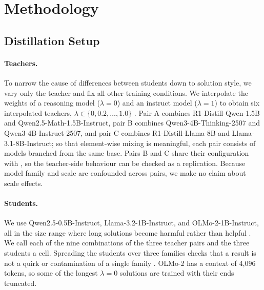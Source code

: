 \section{Methodology}
\label{sec:method}

\subsection{Distillation Setup}
\label{sec:setup}

\paragraph{Teachers.}
To narrow the cause of differences between students down to solution style, we vary only the teacher and fix all other training conditions.
We interpolate the weights of a reasoning model ($\lambda=0$) and an instruct model ($\lambda=1$) to obtain six interpolated teachers, $\lambda \in \{0, 0.2, \dots, 1.0\}$ \citep{wortsman2022soups,ilharco2023task}.
Pair A combines R1-Distill-Qwen-1.5B and Qwen2.5-Math-1.5B-Instruct, pair B combines Qwen3-4B-Thinking-2507 and Qwen3-4B-Instruct-2507, and pair C combines R1-Distill-Llama-8B and Llama-3.1-8B-Instruct; so that element-wise mixing is meaningful, each pair consists of models branched from the same base.
Pairs B and C share their configuration with \citet{wu2026interpolation}, so the teacher-side behaviour can be checked as a replication.
Because model family and scale are confounded across pairs, we make no claim about scale effects.

\paragraph{Students.}
We use Qwen2.5-0.5B-Instruct, Llama-3.2-1B-Instruct, and OLMo-2-1B-Instruct, all in the size range where long solutions become harmful rather than helpful \citep{li2025small}.
We call each of the nine combinations of the three teacher pairs and the three students a cell.
Spreading the students over three families checks that a result is not a quirk or contamination of a single family \citep{wu2026memorization}.
OLMo-2 has a context of 4,096 tokens, so some of the longest $\lambda=0$ solutions are trained with their ends truncated.

